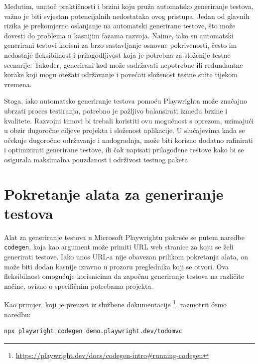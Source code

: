 Međutim, unatoč praktičnosti i brzini koju pruža automatsko generiranje testova, važno je biti svjestan potencijalnih nedostataka ovog pristupa.
Jedan od glavnih rizika je prekomjerno oslanjanje na automatski generirane testove, što može dovesti do problema u kasnijim fazama razvoja.
Naime, iako su automatski generirani testovi korisni za brzo sastavljanje osnovne pokrivenosti, često im nedostaje fleksibilnost i prilagodljivost koja je potrebna za složenije testne scenarije.
Također, generirani kod može sadržavati nepotrebne ili redundantne korake koji mogu otežati održavanje i povećati složenost testne suite tijekom vremena.

Stoga, iako automatsko generiranje testova pomoću Playwrighta može značajno ubrzati proces testiranja, potrebno je pažljivo balansirati između brzine i kvalitete.
Razvojni timovi bi trebali koristiti ovu mogućnost s oprezom, uzimajući u obzir dugoročne ciljeve projekta i složenost aplikacije.
U slučajevima kada se očekuje dugoročno održavanje i nadogradnja, može biti korisno dodatno rafinirati i optimizirati generirane testove, ili čak napisati prilagođene testove kako bi se osigurala maksimalna pouzdanost i održivost testnog paketa.

\section{Pokretanje alata za generiranje testova}

Alat za generiranje testova u Microsoft Playwrightu pokreće se putem naredbe \texttt{codegen}, koja kao argument može primiti URL web stranice za koju se želi generirati testove.
Iako unos URL-a nije obavezan prilikom pokretanja alata, on može biti dodan kasnije izravno u prozoru preglednika koji se otvori.
Ova fleksibilnost omogućuje korisnicima da započnu generiranje testova na različite načine, ovisno o specifičnim potrebama projekta.

Kao primjer, koji je preuzet iz službene dokumentacije \footnote{\url{https://playwright.dev/docs/codegen-intro\#running-codegen}}, razmotrit ćemo naredbu:
\begin{verbatim}
npx playwright codegen demo.playwright.dev/todomvc
\end{verbatim}

